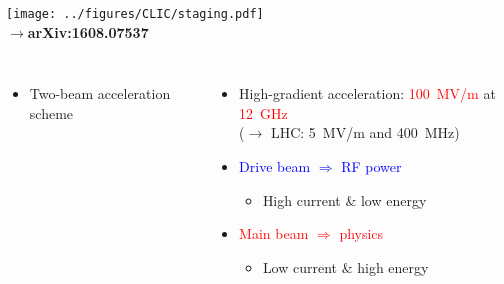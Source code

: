 {\begin{frame}
\begin{columns}
      \centering
      \texttt{[image: ../figures/CLIC/staging.pdf]}
      \\
      \textcolor{RedViolet}{\textbf{$\rightarrow$arXiv:1608.07537}}
    \end{columns}

    \vspace{-0.2cm}
    \begin{columns}[t]
      \begin{itemize}
      \item Two-beam acceleration scheme
      \end{itemize}
      \begin{itemize}
      \item High-gradient acceleration: \textcolor{Red}{100~MV/m} at
        \textcolor{Red}{12~GHz}
        \\
        ($\rightarrow$ LHC: 5~MV/m and 400~MHz)
      \item \textcolor{blue}{Drive beam $\Rightarrow$ RF power}
        \begin{itemize}
        \item High current \& low energy
        \end{itemize}
      \item \textcolor{red}{Main beam $\Rightarrow$ physics}
        \begin{itemize}
        \item Low current \& high energy
        \end{itemize}
      \end{itemize}
    \end{columns}

  \end{frame}
}


